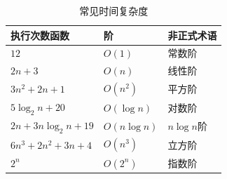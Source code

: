 \begin{frame}
  \begin{table}
    \caption{常见时间复杂度}
    \begin{tabular}{l|l|l}\hline
      执行次数函数&阶&非正式术语\\\hline
      $12$&$O(1)$&常数阶\\[0.05in]
      $2n+3$&$O(n)$&线性阶\\[0.05in]
      $3n^2+2n+1$&$O(n^2)$&平方阶\\[0.05in]
      $5\log_2n+20$&$O(\log n)$&对数阶\\[0.05in]
      $2n+3n\log_2n+19$&$O(n\log n)$&$n\log n$阶\\[0.05in]
      $6n^3+2n^2+3n+4$&$O(n^3)$&立方阶\\[0.05in]
      $2^n$&$O(2^n)$&指数阶\\\hline
    \end{tabular}
  \end{table}
  \pause 
  \begin{figure}
    \centering
  \end{figure}
\end{frame}


\begin{frame}
  
\end{frame}

\begin{frame}
  
\end{frame}

\begin{frame}
  
\end{frame}

\begin{frame}
  
\end{frame}

\begin{frame}
  
\end{frame}

\begin{frame}
  
\end{frame}

\begin{frame}
  
\end{frame}

\begin{frame}
  
\end{frame}

\begin{frame}
  
\end{frame}


\begin{frame}
  
\end{frame}

